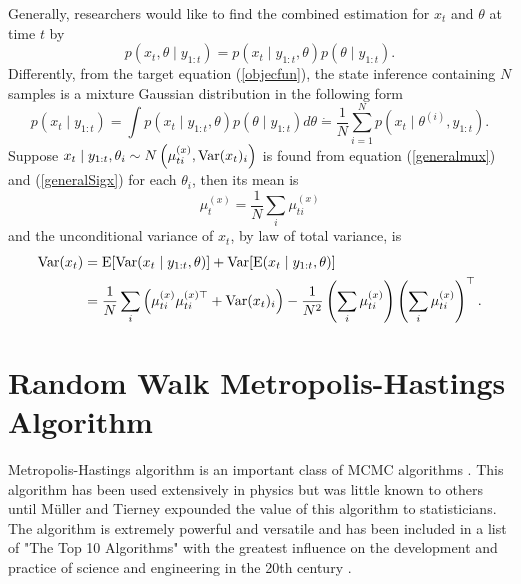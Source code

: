 Generally, researchers would like to find the combined estimation for $x_t$ and $\theta$ at time $t$ by
\begin{equation*}
p(x_t, \theta \mid y_{1:t}) = p(x_t\mid y_{1:t},\theta)p(\theta\mid y_{1:t}).
\end{equation*}
Differently, from the target equation (\ref{objecfun}), the state inference containing $N$ samples is a mixture Gaussian distribution in the following form 
\begin{equation}\label{mixtureGaussian}
p(x_t \mid y_{1:t}) = \int p(x_t\mid y_{1:t},\theta) p(\theta\mid y_{1:t})d\theta \dot{=} \frac{1}{N}\sum_{i=1}^{N}p\left(x_{t}\mid\theta^{(i)},y_{1:t}\right). 
\end{equation}
Suppose $x_t\mid y_{1:t},\theta_i \sim N\left( \mu_{ti}^{(x)},\mathrm{Var}(x_t)_i \right)$ is found from equation (\ref{generalmux}) and (\ref{generalSigx}) for each $\theta_i$, then its mean is 
\begin{equation}\label{mixturemean}
\mu_t^{(x)} = \frac{1}{N} \sum_i \mu_{ti}^{(x)} 
\end{equation}
and  the unconditional variance of $x_t$, by law of total variance, is 
\begin{equation}\label{mixturevariance}
\begin{split}
\mathrm{Var}(x_t) &= \mathrm{E}\lbrack \mathrm{Var}(x_t\mid y_{1:t},\theta)\rbrack + \mathrm{Var}\lbrack \mathrm{E}(x_t\mid y_{1:t},\theta)\rbrack \\
&= \frac{1}{N} \sum_i \left( \mu_{ti}^{(x)}  \mu_{ti}^{(x)\top} +\mathrm{Var}(x_t)_i\right) -\frac{1}{N^2} \left(  \sum_i  \mu_{ti}^{(x)} \right) \left( \sum_i \mu_{ti}^{(x)} \right) ^\top.
\end{split}
\end{equation}

\section{Random Walk Metropolis-Hastings Algorithm}

Metropolis-Hastings algorithm is an important class of MCMC algorithms \cite{smith1993bayesian} \cite{tierney1994markov} \cite{gilks1995markov}.  This algorithm has been used extensively in physics but was little known to others until M\"{u}ller \cite{muller1991generic} and Tierney \cite{tierney1994markov} expounded the value of this algorithm to statisticians. The algorithm is extremely powerful and versatile and has been included in a list of "The Top 10 Algorithms"  with the greatest influence on the development and practice of science and engineering in the 20th century \cite{dongarra2000guest} \cite{medova2008bayesian}. 

